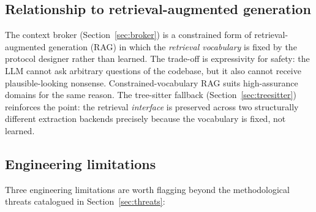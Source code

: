 \documentclass[11pt,a4paper]{article}
\begin{document}
\subsection{Relationship to retrieval-augmented generation}

The context broker (Section~\ref{sec:broker}) is a constrained form
of retrieval-augmented generation (RAG) in which the \emph{retrieval
vocabulary} is fixed by the protocol designer rather than learned.
The trade-off is expressivity for safety: the LLM cannot ask
arbitrary questions of the codebase, but it also cannot receive
plausible-looking nonsense. Constrained-vocabulary RAG suits
high-assurance domains for the same reason. The tree-sitter fallback
(Section~\ref{sec:treesitter}) reinforces the point: the retrieval
\emph{interface} is preserved across two structurally different
extraction backends precisely because the vocabulary is fixed, not
learned.

\subsection{Engineering limitations}
\label{sec:eng-limits}

Three engineering limitations are worth flagging beyond the
methodological threats catalogued in Section~\ref{sec:threats}:
\end{document}

